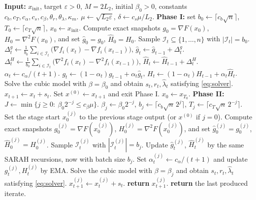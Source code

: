 \documentclass{article}
\theoremstyle{plain}
\theoremstyle{definition}
\theoremstyle{remark}
\begin{document}
\begin{algorithm}[t]
\caption{\textsc{Re$^3$MCN}: EMA-SARAH cubic Newton with terminal homotopy refinement}
\label{alg:re3mcn-thr}
\begin{algorithmic}[1]
\STATE \textbf{Input:} \(x_{\mathrm{init}}\), target \(\varepsilon>0\), \(M=2L_2\), initial \(\beta_0>0\), constants \(c_b,c_T,c_\alpha,c_s,c_\beta,\theta_r,\theta_\lambda,\kappa_m\).
\STATE \(\mu\gets \sqrt{L_2\varepsilon}\), \(\delta\gets c_s \mu/L_2\).
\STATE \textbf{Phase I:} set \(b_0\gets \lceil c_b\sqrt n\rceil\), \(T_0\gets \lceil c_T\sqrt n\rceil\), \(x_0\gets x_{\mathrm{init}}\).
    \STATE Compute exact snapshots \(g_0=\nabla F(x_0)\), \(H_0=\nabla^2F(x_0)\), and set \(\hat g_0=g_0\), \(\hat H_0=H_0\).
        \STATE Sample \(\mathcal I_t\subseteq\{1,\dots,n\}\) with \(|\mathcal I_t|=b_0\).
        \STATE \(\Delta_t^g\gets \frac1{b_0}\sum_{i\in\mathcal I_t}\bigl(\nabla f_i(x_t)-\nabla f_i(x_{t-1})\bigr)\), \(\hat g_t\gets \hat g_{t-1}+\Delta_t^g\).
        \STATE \(\Delta_t^H\gets \frac1{b_0}\sum_{i\in\mathcal I_t}\bigl(\nabla^2 f_i(x_t)-\nabla^2 f_i(x_{t-1})\bigr)\), \(\hat H_t\gets \hat H_{t-1}+\Delta_t^H\).
        \STATE \(\alpha_t\gets c_\alpha/(t+1)\).
        \STATE \(g_t\gets (1-\alpha_t)g_{t-1}+\alpha_t\hat g_t\), \(H_t\gets (1-\alpha_t)H_{t-1}+\alpha_t\hat H_t\).
        \STATE Solve the cubic model with \(\beta=\beta_0\) and obtain \(s_t,r_t,\widehat\lambda_t\) satisfying \eqref{eq:solver}.
        \STATE \(x_{t+1}\gets x_t+s_t\).
            \STATE Set \(x^{(0)}\gets x_{t+1}\) and exit Phase I.
        \ENDIF
    \ENDFOR
    \STATE \(x_0\gets x_{T_0}\).
\ENDWHILE
\STATE \textbf{Phase II:} \(J\gets \min\{j\ge 0:\ \beta_0 2^{-j}\le c_\beta\mu\}\).
    \STATE \(\beta_j\gets \beta_0 2^{-j}\), \(b_j\gets \lceil c_b\sqrt n\,2^j\rceil\), \(T_j\gets \lceil c_T\sqrt n\,2^{-j}\rceil\).
    \STATE Set the stage start \(x_0^{(j)}\) to the previous stage output (or \(x^{(0)}\) if \(j=0\)).
    \STATE Compute exact snapshots \(g_0^{(j)}=\nabla F(x_0^{(j)})\), \(H_0^{(j)}=\nabla^2F(x_0^{(j)})\), and set \(\hat g_0^{(j)}=g_0^{(j)}\), \(\hat H_0^{(j)}=H_0^{(j)}\).
        \STATE Sample \(\mathcal I_t^{(j)}\) with \(|\mathcal I_t^{(j)}|=b_j\).
        \STATE Update \(\hat g_t^{(j)}\), \(\hat H_t^{(j)}\) by the same SARAH recursions, now with batch size \(b_j\).
        \STATE Set \(\alpha_t^{(j)}\gets c_\alpha/(t+1)\) and update \(g_t^{(j)},H_t^{(j)}\) by EMA.
        \STATE Solve the cubic model with \(\beta=\beta_j\) and obtain \(s_t,r_t,\widehat\lambda_t\) satisfying \eqref{eq:solver}.
        \STATE \(x_{t+1}^{(j)}\gets x_t^{(j)}+s_t\).
            \STATE \textbf{return} \(x_{t+1}^{(j)}\).
        \ENDIF
    \ENDFOR
\ENDFOR
\STATE \textbf{return} the last produced iterate.
\end{algorithmic}
\end{algorithm}
\end{document}
